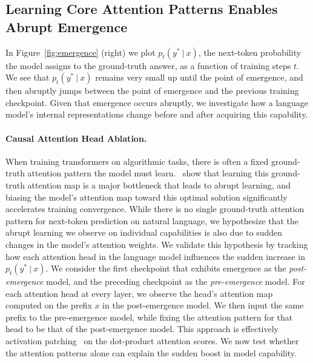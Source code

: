 \documentclass{article}
\newcommand{\given}{\ |\ }
\begin{document}
\subsection{Learning Core Attention Patterns Enables Abrupt Emergence}
In Figure~\ref{fig:emergence} (right) we plot $p_t(y^*\given x)$, the next-token probability the model assigns to the ground-truth answer, as a function of training steps $t$. 
We see that $p_t(y^*\given x)$ remains very small up until the point of emergence, and then abruptly jumps between the point of emergence and the previous training checkpoint. Given that emergence occurs abruptly, we investigate how a language model's internal representations change before and after acquiring this capability.

\paragraph{Causal Attention Head Ablation.} When training transformers on algorithmic tasks, there is often a fixed ground-truth attention pattern the model must learn. \citet{gopalani2025happenslossplateauunderstanding}~show that learning this ground-truth attention map is a major bottleneck that leads to abrupt learning, and biasing the model's attention map toward this optimal solution significantly accelerates training convergence. While there is no single ground-truth attention pattern for next-token prediction on natural language, we hypothesize that the abrupt learning we observe on individual capabilities is also due to sudden changes in the model's attention weights. We validate this hypothesis by tracking how each attention head in the language model influences the sudden increase in $p_t(y^*\given x)$. We consider the first checkpoint that exhibits emergence as the \textit{post-emergence} model, and the preceding checkpoint as the \textit{pre-emergence} model. For each attention head at every layer, we observe the head's attention map computed on the prefix $x$ in the post-emergence model. We then input the same prefix to the pre-emergence model, while fixing the attention pattern for that head to be that of the post-emergence model. This approach is effectively activation patching~\citep{heimersheim2024useinterpretactivationpatching} on the dot-product attention scores. We now test whether the attention patterns alone can explain the sudden boost in model capability.
\end{document}
